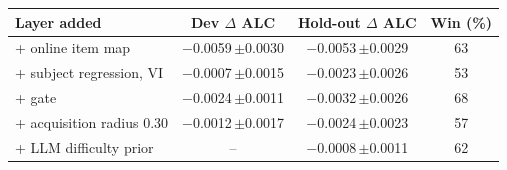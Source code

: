 \begin{tabular}{@{}lccc@{}}
\toprule
Layer added & Dev $\Delta$ ALC & Hold-out $\Delta$ ALC & Win (\%) \\
\midrule
+ online item map & $-$0.0059\,{\scriptsize$\pm$0.0030} & $-$0.0053\,{\scriptsize$\pm$0.0029} & 63 \\
+ subject regression, VI & $-$0.0007\,{\scriptsize$\pm$0.0015} & $-$0.0023\,{\scriptsize$\pm$0.0026} & 53 \\
+ gate & $-$0.0024\,{\scriptsize$\pm$0.0011} & $-$0.0032\,{\scriptsize$\pm$0.0026} & 68 \\
+ acquisition radius 0.30 & $-$0.0012\,{\scriptsize$\pm$0.0017} & $-$0.0024\,{\scriptsize$\pm$0.0023} & 57 \\
+ LLM difficulty prior & -- & $-$0.0008\,{\scriptsize$\pm$0.0011} & 62 \\
\bottomrule
\end{tabular}
